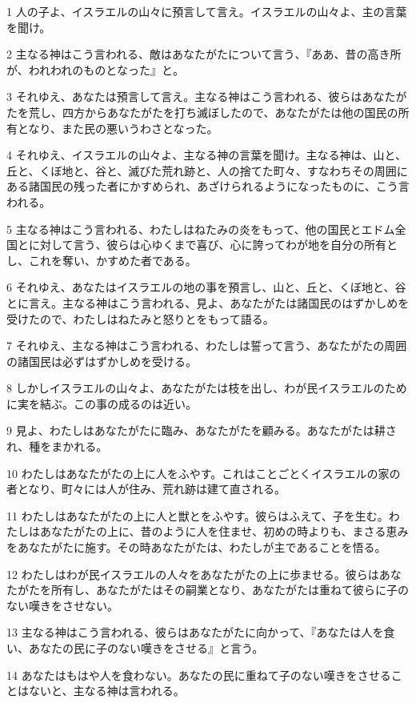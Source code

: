 \par 1 人の子よ、イスラエルの山々に預言して言え。イスラエルの山々よ、主の言葉を聞け。
\par 2 主なる神はこう言われる、敵はあなたがたについて言う、『ああ、昔の高き所が、われわれのものとなった』と。
\par 3 それゆえ、あなたは預言して言え。主なる神はこう言われる、彼らはあなたがたを荒し、四方からあなたがたを打ち滅ぼしたので、あなたがたは他の国民の所有となり、また民の悪いうわさとなった。
\par 4 それゆえ、イスラエルの山々よ、主なる神の言葉を聞け。主なる神は、山と、丘と、くぼ地と、谷と、滅びた荒れ跡と、人の捨てた町々、すなわちその周囲にある諸国民の残った者にかすめられ、あざけられるようになったものに、こう言われる。
\par 5 主なる神はこう言われる、わたしはねたみの炎をもって、他の国民とエドム全国とに対して言う、彼らは心ゆくまで喜び、心に誇ってわが地を自分の所有とし、これを奪い、かすめた者である。
\par 6 それゆえ、あなたはイスラエルの地の事を預言し、山と、丘と、くぼ地と、谷とに言え。主なる神はこう言われる、見よ、あなたがたは諸国民のはずかしめを受けたので、わたしはねたみと怒りとをもって語る。
\par 7 それゆえ、主なる神はこう言われる、わたしは誓って言う、あなたがたの周囲の諸国民は必ずはずかしめを受ける。
\par 8 しかしイスラエルの山々よ、あなたがたは枝を出し、わが民イスラエルのために実を結ぶ。この事の成るのは近い。
\par 9 見よ、わたしはあなたがたに臨み、あなたがたを顧みる。あなたがたは耕され、種をまかれる。
\par 10 わたしはあなたがたの上に人をふやす。これはことごとくイスラエルの家の者となり、町々には人が住み、荒れ跡は建て直される。
\par 11 わたしはあなたがたの上に人と獣とをふやす。彼らはふえて、子を生む。わたしはあなたがたの上に、昔のように人を住ませ、初めの時よりも、まさる恵みをあなたがたに施す。その時あなたがたは、わたしが主であることを悟る。
\par 12 わたしはわが民イスラエルの人々をあなたがたの上に歩ませる。彼らはあなたがたを所有し、あなたがたはその嗣業となり、あなたがたは重ねて彼らに子のない嘆きをさせない。
\par 13 主なる神はこう言われる、彼らはあなたがたに向かって、『あなたは人を食い、あなたの民に子のない嘆きをさせる』と言う。
\par 14 あなたはもはや人を食わない。あなたの民に重ねて子のない嘆きをさせることはないと、主なる神は言われる。
